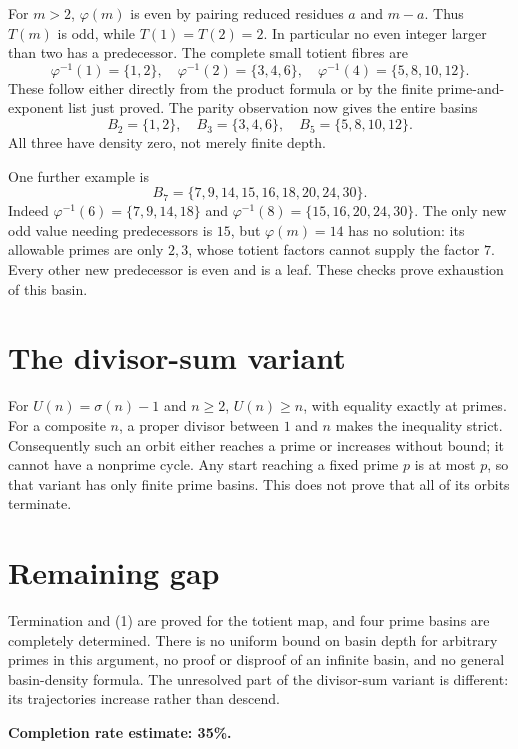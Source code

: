 \documentclass[11pt]{article}
\begin{document}
For $m>2$, $\varphi(m)$ is even by pairing reduced residues $a$ and $m-a$. Thus $T(m)$ is odd, while $T(1)=T(2)=2$. In particular no even integer larger than two has a predecessor. The complete small totient fibres are
\[
 \varphi^{-1}(1)=\{1,2\},\quad
 \varphi^{-1}(2)=\{3,4,6\},\quad
 \varphi^{-1}(4)=\{5,8,10,12\}.
\]
These follow either directly from the product formula or by the finite prime-and-exponent list just proved. The parity observation now gives the entire basins
\[
 B_2=\{1,2\},\quad B_3=\{3,4,6\},\quad
 B_5=\{5,8,10,12\}.
\]
All three have density zero, not merely finite depth.

One further example is
\[
 B_7=\{7,9,14,15,16,18,20,24,30\}.
\]
Indeed $\varphi^{-1}(6)=\{7,9,14,18\}$ and $\varphi^{-1}(8)=\{15,16,20,24,30\}$. The only new odd value needing predecessors is $15$, but $\varphi(m)=14$ has no solution: its allowable primes are only $2,3$, whose totient factors cannot supply the factor $7$. Every other new predecessor is even and is a leaf. These checks prove exhaustion of this basin.

\section*{The divisor-sum variant}
For $U(n)=\sigma(n)-1$ and $n\ge2$, $U(n)\ge n$, with equality exactly at primes. For a composite $n$, a proper divisor between $1$ and $n$ makes the inequality strict. Consequently such an orbit either reaches a prime or increases without bound; it cannot have a nonprime cycle. Any start reaching a fixed prime $p$ is at most $p$, so that variant has only finite prime basins. This does not prove that all of its orbits terminate.

\section*{Remaining gap}
Termination and (1) are proved for the totient map, and four prime basins are completely determined. There is no uniform bound on basin depth for arbitrary primes in this argument, no proof or disproof of an infinite basin, and no general basin-density formula. The unresolved part of the divisor-sum variant is different: its trajectories increase rather than descend.

\textbf{Completion rate estimate: 35\%.}
\end{document}
